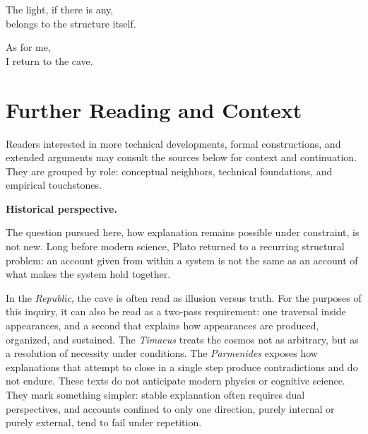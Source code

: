 \documentclass[11pt,twoside,openright]{book}
\newcommand{\BlockParagraphStyle}{%
  \setlength{\parindent}{0pt}%
  \setlength{\parskip}{5pt plus 1pt minus 1pt}%
}
\begin{document}
\bigskip

The light, if there is any,\\
belongs to the structure itself.

\bigskip

As for me,\\
I return to the cave.
\endgroup

\chapter*{Further Reading and Context}
{}

\begingroup
\BlockParagraphStyle

\newcommand{\FRhead}[1]{\par\addvspace{0.6em}\noindent\textbf{#1}\par\nopagebreak\vspace{-0.2em}}

Readers interested in more technical developments, formal constructions, and extended arguments may consult the sources below for context and continuation. They are grouped by role: conceptual neighbors, technical foundations, and empirical touchstones.

\FRhead{Historical perspective.}
The question pursued here,
how explanation remains possible under constraint,
is not new.
Long before modern science, Plato returned to a recurring structural problem:
an account given from within a system is not the same as an account of what makes the system hold together.

In the \emph{Republic}, the cave is often read as illusion versus truth. For the purposes of this inquiry, it can also be read as a two-pass requirement: one traversal inside appearances, and a second that explains how appearances are produced, organized, and sustained. The \emph{Timaeus} treats the cosmos not as arbitrary, but as a resolution of necessity under conditions. The \emph{Parmenides} exposes how explanations that attempt to close in a single step produce contradictions and do not endure. These texts do not anticipate modern physics or cognitive science. They mark something simpler: stable explanation often requires dual perspectives, and accounts confined to only one direction, purely internal or purely external, tend to fail under repetition.
\end{document}
